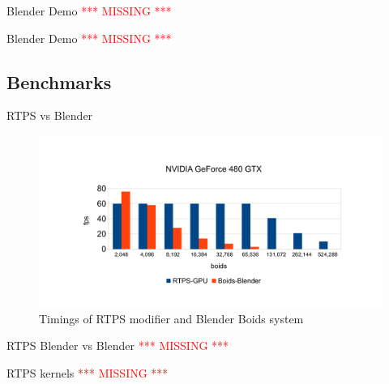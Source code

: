 \documentclass[red]{beamer}
\begin{document}
\begin{frame}{Blender Demo}
\textcolor{red}{*** MISSING ***}
\end{frame}

\begin{frame}{Blender Demo}
\textcolor{red}{*** MISSING ***}
\end{frame}

\subsection{Benchmarks}

\begin{frame}{RTPS vs Blender}
	\begin{figure}[htbp]
	\begin{center}
	\includegraphics[scale=0.30]{../figures/benchmarks.pdf}
	\caption{Timings of RTPS modifier and Blender Boids system}
	\label{plot}
	\end{center}
	\end{figure}
\end{frame}

\begin{frame}{RTPS Blender vs Blender}
\textcolor{red}{*** MISSING ***}
\end{frame}

\begin{frame}{RTPS kernels}
\textcolor{red}{*** MISSING ***}
\end{frame}

\end{document}
